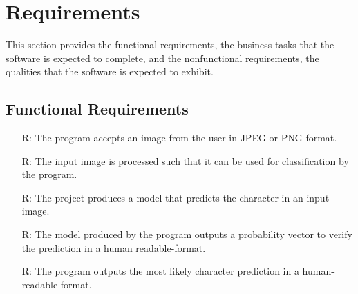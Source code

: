\documentclass[12pt]{article}
\newcounter{reqnum} %
\begin{document}

\section{Requirements}


This section provides the functional requirements, the business tasks that the
software is expected to complete, and the nonfunctional requirements, the
qualities that the software is expected to exhibit.

\subsection{Functional Requirements}

\noindent \begin{itemize}

\item[R\refstepcounter{reqnum}\thereqnum \label{R_Inputs}:] The program accepts
an image from the user in JPEG or PNG format.


\item[R\refstepcounter{reqnum}\thereqnum \label{R_OutputInputs}:] The input
image is processed such that it can be used for classification by the program.


\item[R\refstepcounter{reqnum}\thereqnum \label{R_Calculate}:] The \progname{}
project produces a model that predicts the character in an input image.



\item[R\refstepcounter{reqnum}\thereqnum \label{R_VerifyOutput}:] The model
produced by the program outputs a probability vector to verify the prediction in
a human readable-format.


\item[R\refstepcounter{reqnum}\thereqnum \label{R_Output}:] The program outputs
the most likely character prediction in a human-readable format.


\end{itemize}
\end{document}
